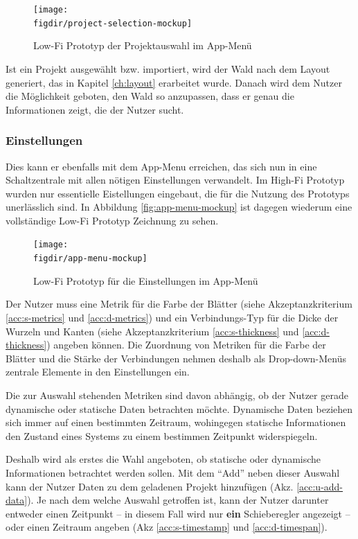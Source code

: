 \begin{figure}[htb]
  \texttt{[image: \\figdir/project-selection-mockup]}
  \caption{Low-Fi Prototyp der Projektauswahl im App-Menü}
  \label{fig:project-selection-mockup}
\end{figure}

Ist ein Projekt ausgewählt bzw. importiert, wird der Wald nach dem Layout generiert, das in Kapitel \ref{ch:layout} erarbeitet wurde. Danach wird dem Nutzer die Möglichkeit geboten, den Wald so anzupassen, dass er genau die Informationen zeigt, die der Nutzer sucht.

\subsubsection*{Einstellungen}

Dies kann er ebenfalls mit dem App-Menu erreichen, das sich nun in eine Schaltzentrale mit allen nötigen Einstellungen verwandelt. Im High-Fi Prototyp wurden nur essentielle Eistellungen eingebaut, die für die Nutzung des Prototyps unerlässlich sind. In Abbildung \ref{fig:app-menu-mockup} ist dagegen wiederum eine vollständige Low-Fi Prototyp Zeichnung zu sehen.

\begin{figure}[htb]
  \texttt{[image: \\figdir/app-menu-mockup]}
  \caption{Low-Fi Prototyp für die Einstellungen im App-Menü}
  \label{fig:settings}
\end{figure}

Der Nutzer muss eine Metrik für die Farbe der Blätter (siehe Akzeptanzkriterium \ref{acc:s-metrics} und \ref{acc:d-metrics}) und ein Verbindungs-Typ für die Dicke der Wurzeln und Kanten (siehe Akzeptanzkriterium \ref{acc:s-thickness} und \ref{acc:d-thickness}) angeben können. Die Zuordnung von Metriken für die Farbe der Blätter und die Stärke der Verbindungen nehmen deshalb als Drop-down-Menüs zentrale Elemente in den Einstellungen ein.

Die zur Auswahl stehenden Metriken sind davon abhängig, ob der Nutzer gerade dynamische oder statische Daten betrachten möchte. Dynamische Daten beziehen sich immer auf einen bestimmten Zeitraum, wohingegen statische Informationen den Zustand eines Systems zu einem bestimmen Zeitpunkt widerspiegeln.

Deshalb wird als erstes die Wahl angeboten, ob statische oder dynamische Informationen betrachtet werden sollen. Mit dem "`Add"' neben dieser Auswahl kann der Nutzer Daten zu dem geladenen Projekt hinzufügen (Akz. \ref{acc:u-add-data}). Je nach dem welche Auswahl getroffen ist, kann der Nutzer darunter entweder einen Zeitpunkt -- in diesem Fall wird nur \textbf{ein} Schieberegler angezeigt -- oder einen Zeitraum angeben (Akz \ref{acc:s-timestamp} und \ref{acc:d-timespan}).

